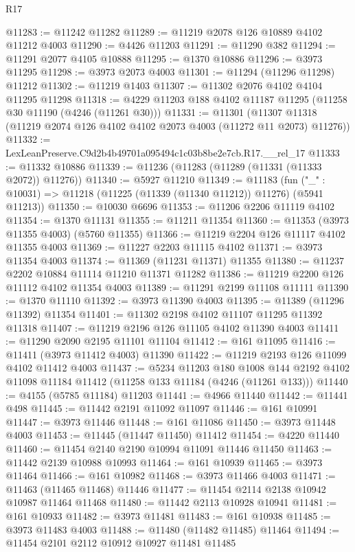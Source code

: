 \begin{lexlean}{R17}
\begin{coremodule}
@11283 := @11242 @11282
@11289 := @11219 @2078 @126 @10889 @4102 @11212 @4003
@11290 := @4426 @11203
@11291 := @11290 @382
@11294 := @11291 @2077 @4105 @10888
@11295 := @1370 @10886
@11296 := @3973 @11295
@11298 := @3973 @2073 @4003
@11301 := @11294 (@11296 @11298) @11212
@11302 := @11219 @1403
@11307 := @11302 @2076 @4102 @4104 @11295 @11298
@11318 := @4229 @11203 @188 @4102 @11187 @11295 (@11258 @30 @11190 (@4246 (@11261 @30)))
@11331 := @11301
    (@11307 @11318 (@11219 @2074 @126 @4102 @4102 @2073 @4003 (@11272 @11 @2073) @11276))
@11332 := LexLeanPreserve.C9d2b4b49701a095494c1c03b8be2e7cb.R17.__rel_17
@11333 := @11332 @10886
@11339 := @11236 (@11283 (@11289 (@11331 (@11333 @2072)) @11276))
@11340 := @5927 @11210
@11349 := @11183
    (fun ("_" : @10031) => @11218 (@11225 (@11339 (@11340 @11212)) @11276) (@5941 @11213))
@11350 := @10030 @6696
@11353 := @11206 @2206 @11119 @4102
@11354 := @1370 @11131
@11355 := @11211 @11354
@11360 := @11353 (@3973 @11355 @4003) (@5760 @11355)
@11366 := @11219 @2204 @126 @11117 @4102 @11355 @4003
@11369 := @11227 @2203 @11115 @4102
@11371 := @3973 @11354 @4003
@11374 := @11369 (@11231 @11371) @11355
@11380 := @11237 @2202 @10884 @11114 @11210 @11371 @11282
@11386 := @11219 @2200 @126 @11112 @4102 @11354 @4003
@11389 := @11291 @2199 @11108 @11111
@11390 := @1370 @11110
@11392 := @3973 @11390 @4003
@11395 := @11389 (@11296 @11392) @11354
@11401 := @11302 @2198 @4102 @11107 @11295 @11392 @11318
@11407 := @11219 @2196 @126 @11105 @4102 @11390 @4003
@11411 := @11290 @2090 @2195 @11101 @11104
@11412 := @161 @11095
@11416 := @11411 (@3973 @11412 @4003) @11390
@11422 := @11219 @2193 @126 @11099 @4102 @11412 @4003
@11437 := @5234
    @11203
    @180
    @1008
    @144
    @2192
    @4102
    @11098
    @11184
    @11412
    (@11258 @133 @11184 (@4246 (@11261 @133)))
@11440 := @4155 (@5785 @11184) @11203
@11441 := @4966 @11440
@11442 := @11441 @498
@11445 := @11442 @2191 @11092 @11097
@11446 := @161 @10991
@11447 := @3973 @11446
@11448 := @161 @11086
@11450 := @3973 @11448 @4003
@11453 := @11445 (@11447 @11450) @11412
@11454 := @4220 @11440
@11460 := @11454 @2140 @2190 @10994 @11091 @11446 @11450
@11463 := @11442 @2139 @10988 @10993
@11464 := @161 @10939
@11465 := @3973 @11464
@11466 := @161 @10982
@11468 := @3973 @11466 @4003
@11471 := @11463 (@11465 @11468) @11446
@11477 := @11454 @2114 @2138 @10942 @10987 @11464 @11468
@11480 := @11442 @2113 @10928 @10941
@11481 := @161 @10933
@11482 := @3973 @11481
@11483 := @161 @10938
@11485 := @3973 @11483 @4003
@11488 := @11480 (@11482 @11485) @11464
@11494 := @11454 @2101 @2112 @10912 @10927 @11481 @11485

\end{coremodule}
\end{lexlean}
